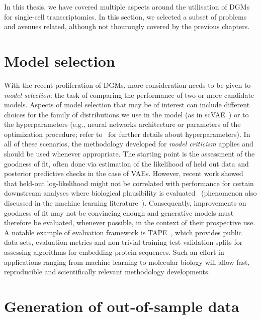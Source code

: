 In this thesis, we have covered multiple aspects around the utilisation of DGMs for single-cell transcriptomics. In this section, we selected a subset of problems and avenues related, although not thourougly covered by the previous chapters. 


\section{Model selection}
With the recent proliferation of DGMs, more consideration needs to be given to \textit{model selection}: the task of comparing the performance of two or more candidate models. %
Aspects of model selection that may be of interest can include different choices for the family of distributions we use in the model (as in scVAE~\cite{Gronbech2019}) or to the hyperparameters (e.g., neural networks architecture or parameters of the optimization procedure; refer to~\cite{Eraslan2019} for further details about hyperparameters). In all of these scenarios, the methodology developed for \textit{model criticism} applies and should be used whenever appropriate. The starting point is the assessment of the goodness of fit, often done via estimation of the likelihood of held out data and posterior predictive checks in the case of VAEs. However, recent work showed that held-out log-likelihood might not be correlated with performance for certain downstream analyses where biological plausibility is evaluated~\cite{Hu2019} (phenomenon also discussed in the machine learning literature~\cite{Theis2016}). %
Consequently, improvements on goodness of fit may not be convincing enough and generative models must therefore be evaluated, whenever possible, in the context of their prospective use. A notable example of evaluation framework is TAPE~\cite{Rao2019}, which provides public data sets, evaluation metrics and non-trivial training-test-validation splits for assessing algorithms for embedding protein sequences. Such an effort in applications ranging from machine learning to molecular biology will allow fast, reproducible and scientifically relevant methodology developments. 


\section{Generation of out-of-sample data}

